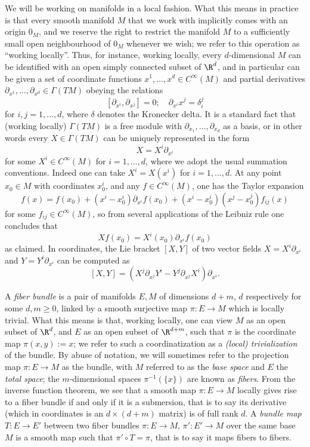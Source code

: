 \documentclass{article}
\numberwithin{equation}{section}
\theoremstyle{plain}
\begin{document}
We will be working on manifolds in a local fashion.  What this means in practice is that every smooth manifold $M$ that we work with implicitly comes with an origin $0_M$, and we reserve the right to restrict the manifold $M$ to a sufficiently small open neighbourhood of $0_M$ whenever we wish; we refer to this operation as ``working locally''.  Thus, for instance, working locally, every $d$-dimensional $M$ can be identified with an open simply connected subset of $\R^d$, and in particular can be given a set of coordinate functions $x^1,\dots,x^d \in C^\infty(M)$ and partial derivatives $\partial_{x^1},\dots,\partial_{x^d} \in \Gamma(TM)$ obeying the relations
$$ [\partial_{x^i}, \partial_{x^j}] = 0; \quad \partial_{x^i} x^j = \delta_i^j$$
for $i,j=1,\dots,d$, where $\delta$ denotes the Kronecker delta.  It is a standard fact that (working locally) $\Gamma(TM)$ is a free module with $\partial_{x_1},\dots,\partial_{x_d}$ as a basis, or in other words every $X \in \Gamma(TM)$ can be uniquely represented in the form
$$ X = X^i \partial_{x^i}$$
for some $X^i \in C^\infty(M)$ for $i=1,\dots,d$, where we adopt the usual summation conventions.  Indeed one can take $X^i = X(x^i)$ for $i=1,\dots,d$.  At any point $x_0 \in M$ with coordinates $x^i_0$, and any $f \in C^\infty(M)$, one has the Taylor expansion
$$ f(x) = f(x_0) + (x^i - x^i_0) \partial_{x^i} f(x_0) + (x^i - x^i_0) (x^j - x^j_0) f_{ij}(x)$$
for some $f_{ij} \in C^\infty(M)$, so from several applications of the Leibniz rule one concludes that
$$ Xf(x_0) = X^i(x_0) \partial_{x^i} f(x_0)$$
as claimed. In coordinates, the Lie bracket $[X,Y]$ of two vector fields $X = X^i \partial_{x^i}$ and $Y = Y^i \partial_{x^i}$ can be computed as
$$ [X,Y] = (X^j \partial_{x^j} Y^i - Y^j \partial_{x^j} X^i) \partial_{x^i}.$$

\smallskip

A \emph{fiber bundle} is a pair of manifolds $E, M$ of dimensions $d+m$, $d$ respectively for some $d,m \geq 0$, linked by a smooth surjective map $\pi: E \to M$ which is locally trivial.  What this means is that, working locally, one can view $M$ as an open subset of $\R^d$, and $E$ as an open subset of $\R^{d+m}$, such that $\pi$ is the coordinate map $\pi(x,y) := x$; we refer to such a coordinatization as a \emph{(local) trivialization} of the bundle.
By abuse of notation, we will sometimes refer to the projection map $\pi: E \to M$ as the bundle, with $M$ referred to as the \emph{base space} and $E$ the \emph{total space}; the $m$-dimensional spaces $\pi^{-1}(\{x\})$ are known as \emph{fibers}.  From the inverse function theorem, we see that a smooth map $\pi: E \to M$ locally gives rise to a fiber bundle if and only if it is a submersion, that is to say its derivative (which in coordinates is an $d \times (d+m)$ matrix) is of full rank $d$. A \emph{bundle map} $T: E \to E'$ between two fiber bundles
$\pi: E \to M$, $\pi': E' \to M$ over the same base $M$ is a smooth map such that $\pi' \circ T = \pi$, that is to say it maps fibers to fibers.\\
\end{document}
